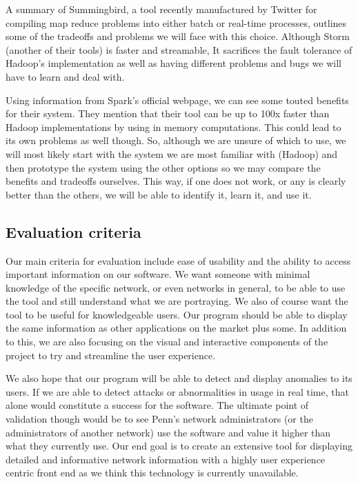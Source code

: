 \documentclass{sig-alternate}
\begin{document}
A summary of Summingbird, a tool recently manufactured by Twitter for compiling
map reduce problems into either batch or real-time processes, outlines some of
the tradeoffs and problems we will face with this choice. Although Storm
(another of their tools) is faster and streamable, It sacrifices the fault
tolerance of Hadoop's implementation as well as having different problems and
bugs we will have to learn and deal with.\cite{TwitterSummingbird}

Using information from Spark's official webpage\cite{ApacheSpark}, we can see
some touted benefits for their system. They mention that their tool can be up to
100x faster than Hadoop implementations by using in memory computations. This
could lead to its own problems as well though. So, although we are unsure of
which to use, we will most likely start with the system we are most familiar
with (Hadoop) and then prototype the system using the other options so we may
compare the benefits and tradeoffs ourselves. This way, if one does not work, or
any is clearly better than the others, we will be able to identify it, learn it,
and use it.

\subsection{Evaluation criteria}

Our main criteria for evaluation include ease of usability and the ability to
access important information on our software. We want someone with minimal
knowledge of the specific network, or even networks in general, to be able to
use the tool and still understand what we are portraying. We also of course want
the tool to be useful for knowledgeable users. Our program should be able to
display the same information as other applications on the market plus some. In
addition to this, we are also focusing on the visual and interactive components
of the project to try and streamline the user experience.

We also hope that our program will be able to detect and display anomalies to
its users. If we are able to detect attacks or abnormalities in usage in real
time, that alone would constitute a success for the software. The ultimate point
of validation though would be to see Penn's network administrators (or the
administrators of another network) use the software and value it higher than
what they currently use. Our end goal is to create an extensive tool for
displaying detailed and informative network information with a highly user
experience centric front end as we think this technology is currently
unavailable.
\end{document}
